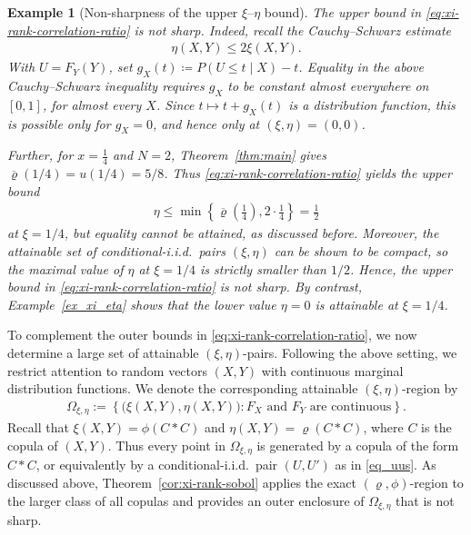 \documentclass{article}
\newtheorem{example}[theorem]{Example}
\newcommand{\brho}{\overline\varrho}
\begin{document}
\begin{example}[Non-sharpness of the upper \(\xi\)--\(\eta\) bound]
\label{ex:xi-eta-upper-not-sharp}
The upper bound in \eqref{eq:xi-rank-correlation-ratio} is not sharp.
Indeed, recall the Cauchy--Schwarz estimate
\begin{align*}
    \eta(X,Y)\leq 2\xi(X,Y).
\end{align*}
With \(U=F_Y(Y)\), set \(g_X(t)\coloneqq P(U\leq t\mid X)-t\).
Equality in the above Cauchy--Schwarz inequality requires \(g_X\) to be constant almost everywhere on \([0,1]\), for almost every \(X\).
Since \(t\mapsto t+g_X(t)\) is a distribution function, this is possible only for \(g_X=0\), and hence only at \((\xi,\eta)=(0,0)\).

Further, for \(x = \frac 1 4 \) and \(N=2\), Theorem~\ref{thm:main} gives \(\brho(1/4)=u(1/4)=5/8\).
Thus \eqref{eq:xi-rank-correlation-ratio} yields the upper bound
\begin{align*}
    \eta\leq
    \min\left\{\brho\left(\frac14\right),2\cdot \frac14\right\}
    =\frac12
\end{align*}
at \(\xi=1/4\), but equality cannot be attained, as discussed before.
Moreover, the attainable set of conditional-i.i.d.\ pairs \((\xi,\eta)\) can be shown to be compact, so the maximal value of \(\eta\) at \(\xi=1/4\) is strictly smaller than \(1/2\).
Hence, the upper bound in \eqref{eq:xi-rank-correlation-ratio} is not sharp.
By contrast, Example~\ref{ex_xi_eta} shows that the lower value \(\eta=0\) is attainable at \(\xi=1/4\).
\end{example}




To complement the outer bounds in \eqref{eq:xi-rank-correlation-ratio}, we now determine a large set of attainable \((\xi,\eta)\)-pairs.
Following the above setting, we restrict attention to random vectors \((X,Y)\) with continuous marginal distribution functions.
We denote the corresponding attainable \((\xi,\eta)\)-region by
\begin{align}\label{def:xi-eta-region}
    \Omega_{\xi,\eta}
    :=
    \left\{
        \bigl(\xi(X,Y),\eta(X,Y)\bigr):
        F_X \text{ and } F_Y \text{ are continuous}
    \right\}.
\end{align}
Recall that \(\xi(X,Y)=\phi(C\ast C)\) and \(\eta(X,Y)=\varrho(C\ast C)\), where \(C\) is the copula of \((X,Y)\).
Thus every point in \(\Omega_{\xi,\eta}\) is generated by a copula of the form \(C\ast C\), or equivalently by a conditional-i.i.d.\ pair \((U,U')\) as in \eqref{eq_uus}.
As discussed above, Theorem~\ref{cor:xi-rank-sobol} applies the exact \((\varrho,\phi)\)-region to the larger class of all copulas and provides an outer enclosure of \(\Omega_{\xi,\eta}\) that is not sharp.
\end{document}
